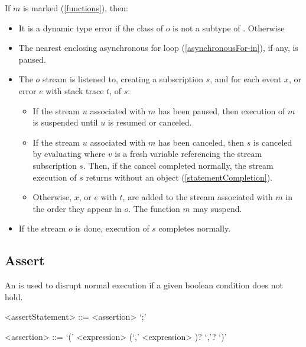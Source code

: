 \documentclass[makeidx]{article}
\begin{document}
{\LMHash{}%
If $m$ is marked \code{\ASYNC*} (\ref{functions}), then:
\begin{itemize}
\item
  It is a dynamic type error if the class of $o$
  is not a subtype of .
  Otherwise
\item
  The nearest enclosing asynchronous for loop (\ref{asynchronousFor-in}),
  if any, is paused.
\item
  The $o$ stream is listened to, creating a subscription $s$,
  and for each event $x$, or error $e$ with stack trace $t$, of $s$:
  \begin{itemize}
  \item
    If the stream $u$ associated with $m$ has been paused,
    then execution of $m$ is suspended until $u$ is resumed or canceled.
  \item
    If the stream $u$ associated with $m$ has been canceled,
    then $s$ is canceled by evaluating 
    where $v$ is a fresh variable referencing the stream subscription $s$.
    Then, if the cancel completed normally,
    the stream execution of $s$ returns without an object
    (\ref{statementCompletion}).
  \item
    Otherwise, $x$, or $e$ with $t$, are added to
    the stream associated with $m$ in the order they appear in $o$.
    The function $m$ may suspend.
  \end{itemize}
\item
  If the stream $o$ is done, execution of $s$ completes normally.
\end{itemize}


\subsection{Assert}

\LMHash{}%
An  is used to disrupt normal execution
if a given boolean condition does not hold.

\begin{grammar}
<assertStatement> ::= <assertion> `;'

<assertion> ::= \ASSERT{} `(' <expression> (`,' <expression> )? `,'? `)'
\end{grammar}

}
\end{document}
